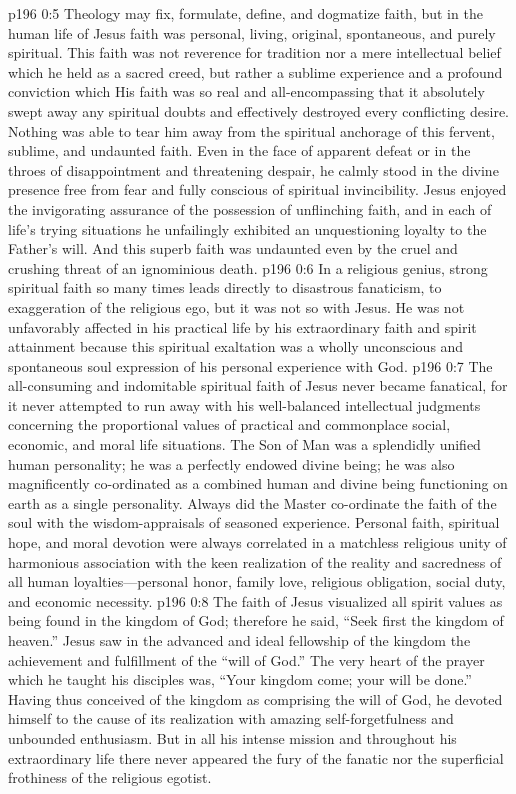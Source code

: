 \vs p196 0:5 Theology may fix, formulate, define, and dogmatize faith, but in the human life of Jesus faith was personal, living, original, spontaneous, and purely spiritual. This faith was not reverence for tradition nor a mere intellectual belief which he held as a sacred creed, but rather a sublime experience and a profound conviction which  His faith was so real and all\hyp{}encompassing that it absolutely swept away any spiritual doubts and effectively destroyed every conflicting desire. Nothing was able to tear him away from the spiritual anchorage of this fervent, sublime, and undaunted faith. Even in the face of apparent defeat or in the throes of disappointment and threatening despair, he calmly stood in the divine presence free from fear and fully conscious of spiritual invincibility. Jesus enjoyed the invigorating assurance of the possession of unflinching faith, and in each of life’s trying situations he unfailingly exhibited an unquestioning loyalty to the Father’s will. And this superb faith was undaunted even by the cruel and crushing threat of an ignominious death.
\vs p196 0:6 In a religious genius, strong spiritual faith so many times leads directly to disastrous fanaticism, to exaggeration of the religious ego, but it was not so with Jesus. He was not unfavorably affected in his practical life by his extraordinary faith and spirit attainment because this spiritual exaltation was a wholly unconscious and spontaneous soul expression of his personal experience with God.
\vs p196 0:7 The all\hyp{}consuming and indomitable spiritual faith of Jesus never became fanatical, for it never attempted to run away with his well\hyp{}balanced intellectual judgments concerning the proportional values of practical and commonplace social, economic, and moral life situations. The Son of Man was a splendidly unified human personality; he was a perfectly endowed divine being; he was also magnificently co\hyp{}ordinated as a combined human and divine being functioning on earth as a single personality. Always did the Master co\hyp{}ordinate the faith of the soul with the wisdom\hyp{}appraisals of seasoned experience. Personal faith, spiritual hope, and moral devotion were always correlated in a matchless religious unity of harmonious association with the keen realization of the reality and sacredness of all human loyalties---personal honor, family love, religious obligation, social duty, and economic necessity.
\vs p196 0:8 The faith of Jesus visualized all spirit values as being found in the kingdom of God; therefore he said, \textcolor{ubdarkred}{“Seek first the kingdom of heaven.”} Jesus saw in the advanced and ideal fellowship of the kingdom the achievement and fulfillment of the “will of God.” The very heart of the prayer which he taught his disciples was, “Your kingdom come; your will be done.” Having thus conceived of the kingdom as comprising the will of God, he devoted himself to the cause of its realization with amazing self\hyp{}forgetfulness and unbounded enthusiasm. But in all his intense mission and throughout his extraordinary life there never appeared the fury of the fanatic nor the superficial frothiness of the religious egotist.
